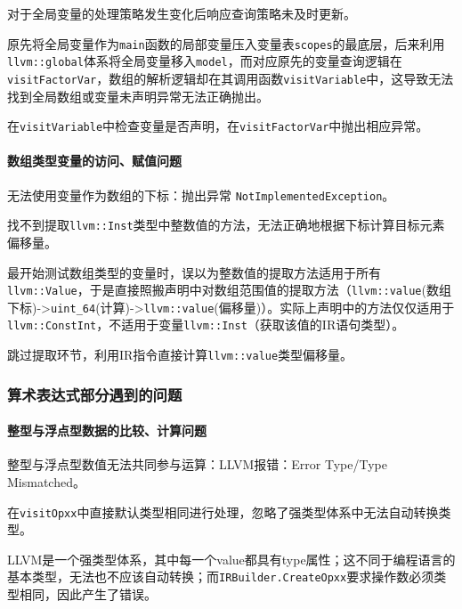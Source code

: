 \documentclass[lang=cn,11pt,a4paper,cite=authornum]{paper}
\begin{document}
对于全局变量的处理策略发生变化后响应查询策略未及时更新。

原先将全局变量作为\texttt{main}函数的局部变量压入变量表\texttt{scopes}的最底层，后来利用 \texttt{llvm::global}体系将全局变量移入\texttt{model}，而对应原先的变量查询逻辑在\texttt{visitFactorVar}，数组的解析逻辑却在其调用函数\texttt{visitVariable}中，这导致无法找到全局数组或变量未声明异常无法正确抛出。

在\texttt{visitVariable}中检查变量是否声明，在\texttt{visitFactorVar}中抛出相应异常。

\paragraph{数组类型变量的访问、赋值问题}

无法使用变量作为数组的下标：抛出异常 \texttt{NotImplementedException}。

找不到提取\texttt{llvm::Inst}类型中整数值的方法，无法正确地根据下标计算目标元素偏移量。

最开始测试数组类型的变量时，误以为整数值的提取方法适用于所有\texttt{llvm::Value}，于是直接照搬声明中对数组范围值的提取方法（\texttt{llvm::value}(数组下标)->\texttt{uint_64}(计算)->\texttt{llvm::value}(偏移量)）。实际上声明中的方法仅仅适用于\texttt{llvm::ConstInt}，不适用于变量\texttt{llvm::Inst}（获取该值的IR语句类型）。

跳过提取环节，利用IR指令直接计算\texttt{llvm::value}类型偏移量。

\subsubsection{算术表达式部分遇到的问题}

\paragraph{整型与浮点型数据的比较、计算问题}

整型与浮点型数值无法共同参与运算：LLVM报错：Error Type/Type Mismatched。

在\texttt{visitOpxx}中直接默认类型相同进行处理，忽略了强类型体系中无法自动转换类型。

LLVM是一个强类型体系，其中每一个value都具有type属性；这不同于编程语言的基本类型，无法也不应该自动转换；而\texttt{IRBuilder.CreateOpxx}要求操作数必须类型相同，因此产生了错误。
\end{document}
